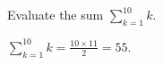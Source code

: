 \question Evaluate the sum $\sum_{k=1}^{10} k$.
\begin{solution}
$\sum_{k=1}^{10} k = \frac{10 \times 11}{2} = 55$.
\end{solution}
